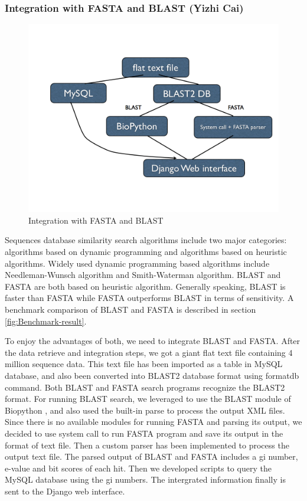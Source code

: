 \documentclass[11pt,letterpaper,twoside,english]{article}
\begin{document}
\subsubsection{\label{sub:Integration-with-FASTA}Integration with FASTA and
BLAST (Yizhi Cai)}

%
\begin{figure}[H]
\begin{centering}
\includegraphics[width=0.7\linewidth]{figures/Data_flow}
\par\end{centering}

\caption{\label{fig:Integration-with-FASTA}Integration with FASTA and BLAST}

\end{figure}


Sequences database similarity search algorithms include two major
categories: algorithms based on dynamic programming and algorithms
based on heuristic algorithms. Widely used dynamic programming based
algorithms include Needleman-Wunsch algorithm and Smith-Waterman algorithm.
BLAST and FASTA are both based on heuristic algorithm. Generally speaking,
BLAST is faster than FASTA while FASTA outperforms BLAST in terms
of sensitivity. A benchmark comparison of BLAST and FASTA is described
in section \ref{fig:Benchmark-result}.

To enjoy the advantages of both, we need to integrate BLAST and FASTA.
After the data retrieve and integration steps, we got a giant flat
text file containing 4 million sequence data. This text file has been
imported as a table in MySQL database, and also been converted into
BLAST2 database format using formatdb command. Both BLAST and FASTA
search programs recognize the BLAST2 format. For running BLAST search,
we leveraged to use the BLAST module of Biopython \citet{Cock:2009p22197},
and also used the built-in parse to process the output XML files.
Since there is no available modules for running FASTA and parsing
its output, we decided to use system call to run FASTA program and
save its output in the format of text file. Then a custom parser has
been implemented to process the output text file. The parsed output
of BLAST and FASTA includes a gi number, e-value and bit scores of
each hit. Then we developed scripts to query the MySQL database using
the gi numbers. The intergrated information finally is sent to the
Django web interface.
\end{document}
